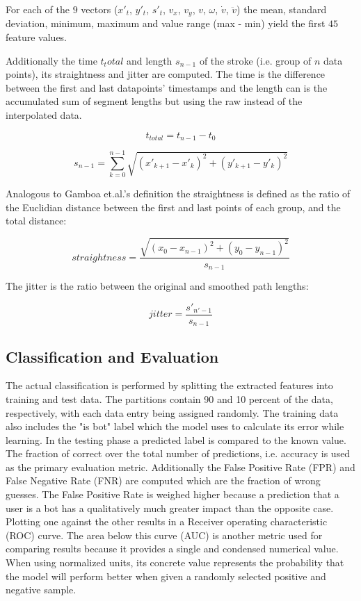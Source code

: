 \documentclass[
    fontsize=12pt,
    headings=small,
    parskip=half,           %
    bibliography=totoc,
    numbers=noenddot,       %
    open=any,               %
    final,                   %
    table
]{scrreprt}
\begin{document}
For each of the $9$ vectors ($x'_t$, $y'_t$, $s'_t$, $v_x$, $v_y$, $v$, $\omega$, $\dot{v}$, $\ddot{v}$) the mean, standard deviation, minimum, maximum and value range (max - min) yield the first $45$ feature values.

Additionally the time $t_total$ and length $s_{n-1}$ of the stroke (i.e. group of $n$ data points), its straightness and jitter are computed. The time is the difference between the first and last datapoints' timestamps and the length can is the accumulated sum of segment lengths but using the raw instead of the interpolated data.

\[
t_{total} = t_{n-1} - t_0
\]

\[
s_{n-1} = \sum_{k = 0}^{n - 1} \sqrt{(x'_{k+1} - x'_{k})^2 + (y'_{k+1} - y'_{k})^2}
\]

Analogous to Gamboa et.al.'s definition\cite{GAMBOA2004} the straightness is defined as the ratio of the Euclidian distance between the first and last points of each group, and the total distance:

\[
straightness = \frac{ \sqrt{ (x_0 - x_{n-1})^2 + (y_0 - y_{n-1})^2 } }{s_{n-1}}
\]

The jitter is the ratio between the original and smoothed path lengths:

\[
jitter = \frac{s'_{n'-1}}{s_{n-1}}
\]



\subsection{Classification and Evaluation}

The actual classification is performed by splitting the extracted features into training and test data. The partitions contain 90 and 10 percent of the data, respectively, with each data entry being assigned randomly. The training data also includes the "is bot" label which the model uses to calculate its error while learning. In the testing phase a predicted label is compared to the known value. The fraction of correct over the total number of predictions, i.e. accuracy is used as the primary evaluation metric. Additionally the False Positive Rate (FPR) and False Negative Rate (FNR) are computed which are the fraction of wrong guesses. The False Positive Rate is weighed higher because a prediction that a user is a bot has a qualitatively much greater impact than the opposite case. Plotting one against the other results in a Receiver operating characteristic (ROC) curve. The area below this curve (AUC) is another metric used for comparing results because it provides a single and condensed numerical value. When using normalized units, its concrete value represents the probability that the model will perform better when given a randomly selected positive and negative sample.\cite{FAWCETT2006861}
\end{document}
